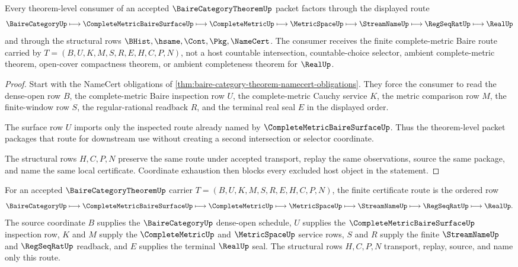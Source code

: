 \begin{theorem}
\label{thm:baire-category-theorem-complete-metric-nonescape}
Every theorem-level consumer of an accepted $\BaireCategoryTheoremUp$ packet factors through the displayed route
$$
\BaireCategoryUp \longmapsto \CompleteMetricBaireSurfaceUp \longmapsto \CompleteMetricUp \longmapsto \MetricSpaceUp \longmapsto \StreamNameUp \longmapsto \RegSeqRatUp \longmapsto \RealUp
$$
and through the structural rows $\BHist,\hsame,\Cont,\Pkg,\NameCert$. The consumer receives the finite complete-metric Baire route carried by $T=(B,U,K,M,S,R,E,H,C,P,N)$, not a host countable intersection, countable-choice selector, ambient complete-metric theorem, open-cover compactness theorem, or ambient completeness theorem for $\RealUp$.
\end{theorem}
\begin{proof}
Start with the NameCert obligations of \autoref{thm:baire-category-theorem-namecert-obligations}. They force the consumer to read the dense-open row $B$, the complete-metric Baire inspection row $U$, the complete-metric Cauchy service $K$, the metric comparison row $M$, the finite-window row $S$, the regular-rational readback $R$, and the terminal real seal $E$ in the displayed order.

The surface row $U$ imports only the inspected route already named by $\CompleteMetricBaireSurfaceUp$. Thus the theorem-level packet packages that route for downstream use without creating a second intersection or selector coordinate.

The structural rows $H,C,P,N$ preserve the same route under accepted transport, replay the same observations, source the same package, and name the same local certificate. Coordinate exhaustion then blocks every excluded host object in the statement.
\end{proof}

\begin{definition}
\label{def:baire-category-theorem-finite-certificate-route}
For an accepted $\BaireCategoryTheoremUp$ carrier $T=(B,U,K,M,S,R,E,H,C,P,N)$, the finite certificate route is the ordered row
$$
\BaireCategoryUp \longmapsto \CompleteMetricBaireSurfaceUp \longmapsto \CompleteMetricUp \longmapsto \MetricSpaceUp \longmapsto \StreamNameUp \longmapsto \RegSeqRatUp \longmapsto \RealUp.
$$
The source coordinate $B$ supplies the $\BaireCategoryUp$ dense-open schedule, $U$ supplies the $\CompleteMetricBaireSurfaceUp$ inspection row, $K$ and $M$ supply the $\CompleteMetricUp$ and $\MetricSpaceUp$ service rows, $S$ and $R$ supply the finite $\StreamNameUp$ and $\RegSeqRatUp$ readback, and $E$ supplies the terminal $\RealUp$ seal. The structural rows $H,C,P,N$ transport, replay, source, and name only this route.
\end{definition}

